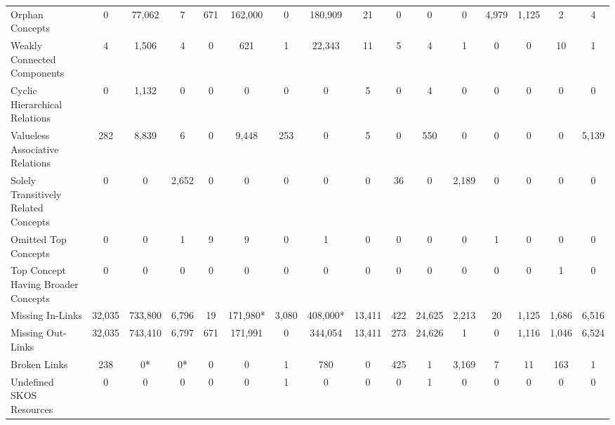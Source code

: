 \begin{table}[h]
\begin{center}
{\begin{tabular}{lccccccccccccccc}
Orphan Concepts & 0 & 77,062 & 7 & 671 & 162,000 & 0 & 180,909 & 21 & 0 & 0 & 0 & 4,979 & 1,125 & 2 & 4 \\

Weakly Connected Components & 4 & 1,506 & 4 & 0 & 621 & 1 & 22,343 & 11 & 5 & 4 & 1 & 0 & 0 & 10 & 1 \\

Cyclic Hierarchical Relations & 0 & 1,132 & 0 & 0 & 0 & 0 & 0 & 5 & 0 & 4 & 0 & 0 & 0 & 0 & 0 \\

Valueless Associative Relations & 282 & 8,839 & 6 & 0 & 9,448 & 253 & 0 & 5 & 0 & 550 & 0 & 0 & 0 & 0 & 5,139 \\

Solely Transitively Related Concepts & 0 & 0 & 2,652 & 0 & 0 & 0 & 0 & 0 & 36 & 0 & 2,189 & 0 & 0 & 0 & 0 \\

Omitted Top Concepts & 0 & 0 & 1 & 9 & 9 & 0 & 1 & 0 & 0 & 0 & 0 & 1 & 0 & 0 & 0 \\

Top Concept Having Broader Concepts & 0 & 0 & 0 & 0 & 0 & 0 & 0 & 0 & 0 & 0 & 0 & 0 & 0 & 1 & 0 \\

\midrule

Missing In-Links & 32,035 & 733,800 & 6,796 & 19 & 171,980* & 3,080 & 408,000* & 13,411 & 422 & 24,625 & 2,213 & 20 & 1,125 & 1,686 & 6,516 \\

Missing Out-Links & 32,035 & 743,410 & 6,797 & 671 & 171,991 & 0 & 344,054 & 13,411 & 273 & 24,626 & 1 & 0 & 1,116 & 1,046 & 6,524 \\

Broken Links & 238 & 0* & 0* & 0 & 0 & 1 & 780 & 0 & 425 & 1 & 3,169 & 7 & 11 & 163 & 1 \\

Undefined SKOS Resources & 0 & 0 & 0 & 0 & 0 & 1 & 0 & 0 & 0 & 1 & 0 & 0 & 0 & 0 & 0 \\

\bottomrule
\end{tabular}
}
\end{center}
\end{table}


